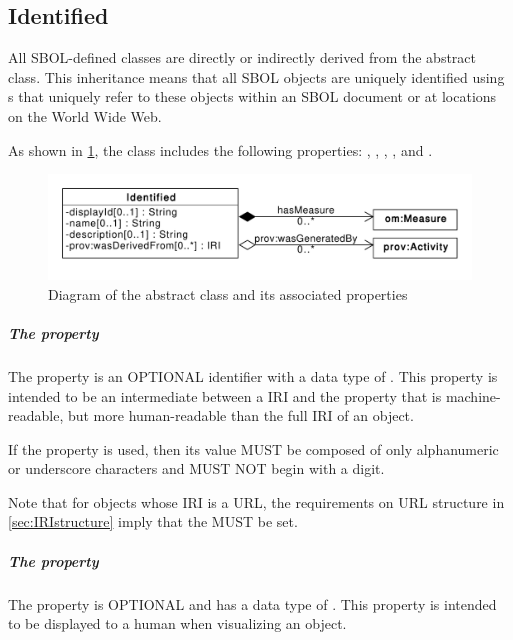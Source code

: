 \subsection{Identified}
\label{sec:Identified}

All SBOL-defined classes are directly or indirectly derived from the   abstract class.
This inheritance means that all SBOL objects are uniquely identified using s that uniquely refer to these objects within an SBOL document or at locations on the World Wide Web.

As shown in \ref{uml:identified}, the  class includes the following properties: ,  , , , and . 

\begin{figure}[ht]
\begin{center}
\includegraphics[scale=0.6]{uml/identified}
\caption[]{Diagram of the  abstract class and its associated properties}
\label{uml:identified}
\end{center}
\end{figure}
  
\subparagraph{The  property}
\label{sec:displayId}
The  property is an OPTIONAL identifier with a data type of . This property is intended to be an intermediate between a IRI and the  property that is machine-readable, but more human-readable than the full IRI of an object.

If the  property is used, then its  value MUST be composed of only alphanumeric or underscore characters and MUST NOT begin with a digit.

Note that for objects whose IRI is a URL, the requirements on URL structure in \ref{sec:IRIstructure} imply that the  MUST be set.

\subparagraph{The  property}
\label{sec:name}

The  property is OPTIONAL and has a data type of . This property is intended to be displayed to a human when visualizing an  object.

